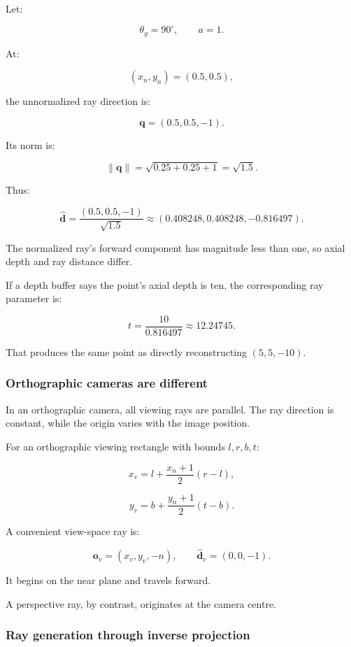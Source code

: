 Let:

\[ \theta_y=90^\circ,\qquad a=1. \]

At:

\[ (x_n,y_n)=(0.5,0.5), \]

the unnormalized ray direction is:

\[ \mathbf q=(0.5,0.5,-1). \]

Its norm is:

\[ \|\mathbf q\|= \sqrt{0.25+0.25+1} =\sqrt{1.5}. \]

Thus:

\[ \boxed{ \hat{\mathbf d} = \frac{(0.5,0.5,-1)}{\sqrt{1.5}} \approx (0.408248,0.408248,-0.816497). } \]

The normalized ray's forward component has magnitude less than one, so axial depth and ray distance differ.

If a depth buffer says the point's axial depth is ten, the corresponding ray parameter is:

\[ t=\frac{10}{0.816497}\approx12.24745. \]

That produces the same point as directly reconstructing \((5,5,-10)\).

\subsubsection{Orthographic cameras are different}\label{orthographic-cameras-are-different}

In an orthographic camera, all viewing rays are parallel. The ray direction is constant, while the origin varies with the image position.

For an orthographic viewing rectangle with bounds \(l,r,b,t\):

\[ x_v=l+\frac{x_n+1}{2}(r-l), \]

\[ y_v=b+\frac{y_n+1}{2}(t-b). \]

A convenient view-space ray is:

\[ \boxed{ \mathbf o_v=(x_v,y_v,-n), \qquad \hat{\mathbf d}_v=(0,0,-1). } \]

It begins on the near plane and travels forward.

A perspective ray, by contrast, originates at the camera centre.

\subsubsection{Ray generation through inverse projection}\label{ray-generation-through-inverse-projection}

